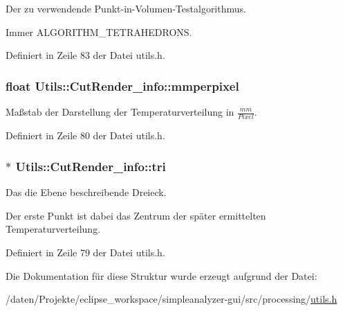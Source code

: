 Der zu verwendende Punkt-\/in-\/\-Volumen-\/\-Testalgorithmus. 

Immer A\-L\-G\-O\-R\-I\-T\-H\-M\-\_\-\-T\-E\-T\-R\-A\-H\-E\-D\-R\-O\-N\-S. 

Definiert in Zeile 83 der Datei utils.\-h.

\hypertarget{structUtils_1_1CutRender__info_aca49d9537a774906b88f3fd7059d2dcb}{
\subsubsection[{mmperpixel}]{\setlength{\rightskip}{0pt plus 5cm}float Utils\-::\-Cut\-Render\-\_\-info\-::mmperpixel}}\label{structUtils_1_1CutRender__info_aca49d9537a774906b88f3fd7059d2dcb}


Maßstab der Darstellung der Temperaturverteilung in $\frac{mm}{Pixel}$. 



Definiert in Zeile 80 der Datei utils.\-h.

\hypertarget{structUtils_1_1CutRender__info_a2998343c733073b317fdd04bd341ce1f}{
\subsubsection[{tri}]{$\ast$ Utils\-::\-Cut\-Render\-\_\-info\-::tri}}\label{structUtils_1_1CutRender__info_a2998343c733073b317fdd04bd341ce1f}


Das die Ebene beschreibende Dreieck. 

Der erste Punkt ist dabei das Zentrum der später ermittelten Temperaturverteilung. 

Definiert in Zeile 79 der Datei utils.\-h.



Die Dokumentation für diese Struktur wurde erzeugt aufgrund der Datei\-:\begin{DoxyCompactItemize}
\item 
/daten/\-Projekte/eclipse\-\_\-workspace/simpleanalyzer-\/gui/src/processing/\hyperlink{utils_8h}{utils.\-h}\end{DoxyCompactItemize}
